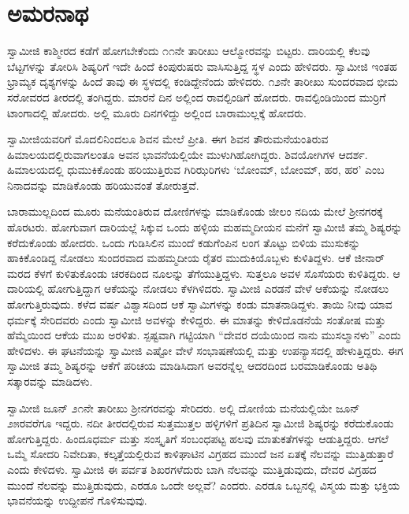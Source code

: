
\chapter{ಅಮರನಾಥ  }

 ಸ್ವಾಮೀಜಿ ಕಾಶ್ಮೀರದ ಕಡೆಗೆ ಹೋಗಬೇಕೆಂದು ೧೧ನೇ ತಾರೀಖು ಆಲ್ಮೋರವನ್ನು ಬಿಟ್ಟರು. ದಾರಿಯಲ್ಲಿ ಕೆಲವು ಬೆಟ್ಟಗಳನ್ನು ತೋರಿಸಿ ಶಿಷ್ಯರಿಗೆ ಇದೇ ಹಿಂದೆ ಕಿಂಪುರುಷರು ವಾಸಿಸುತ್ತಿದ್ದ ಸ್ಥಳ ಎಂದು ಹೇಳಿದರು. ಸ್ವಾಮೀಜಿ ಇಂತಹ ಭ್ರಾಮ್ಯಕ ದೃಶ್ಯಗಳನ್ನು ಹಿಂದೆ ತಾವು ಈ ಸ್ಥಳದಲ್ಲಿ ಕಂಡಿದ್ದೇನೆಂದು ಹೇಳಿದರು. ೧೨ನೇ ತಾರೀಖು ಸುಂದರವಾದ ಭೀಮ ಸರೋವರದ ತೀರದಲ್ಲಿ ತಂಗಿದ್ದರು. ಮಾರನೆ ದಿನ ಅಲ್ಲಿಂದ ರಾವಲ್ಪಿಂಡಿಗೆ ಹೋದರು. ರಾವಲ್ಪಿಂಡಿಯಿಂದ ಮುರ‍್ರಿಗೆ ಟಾಂಗಾದಲ್ಲಿ ಹೋದರು. ಅಲ್ಲಿ ಮೂರು ದಿನಗಳಿದ್ದು ಅಲ್ಲಿಂದ ಬಾರಾಮುಲ್ಲಕ್ಕೆ ಹೋದರು. 

 ಸ್ವಾಮೀಜಿಯವರಿಗೆ ಮೊದಲಿನಿಂದಲೂ ಶಿವನ ಮೇಲೆ ಪ್ರೀತಿ. ಈಗ ಶಿವನ ತೌರುಮನೆಯಂತಿರುವ ಹಿಮಾಲಯದಲ್ಲಿರುವಾಗಲಂತೂ ಅವನ ಭಾವನೆಯಲ್ಲಿಯೇ ಮುಳುಗಿಹೋಗಿದ್ದರು. ಶಿವಯೋಗಿಗಳ ಆದರ್ಶ. ಹಿಮಾಲಯದಲ್ಲಿ ಧುಮುಕಿಕೊಂಡು ಹರಿಯುತ್ತಿರುವ ಗಿರಿಝರಿಗಳು ‘ಬೋಂಮ್, ಬೋಂಮ್, ಹರ, ಹರ’ ಎಂಬ ನಿನಾದವನ್ನು ಮಾಡಿಕೊಂಡು ಹರಿಯುವಂತೆ ತೋರುತ್ತವೆ. 

 ಬಾರಾಮುಲ್ಲದಿಂದ ಮೂರು ಮನೆಯಂತಿರುವ ದೋಣಿಗಳನ್ನು ಮಾಡಿಕೊಂಡು ಜೀಲಂ ನದಿಯ ಮೇಲೆ ಶ‍್ರೀನಗರಕ್ಕೆ ಹೊರಟರು. ಹೋಗುವಾಗ ದಾರಿಯಲ್ಲೆ ಸಿಕ್ಕುವ ಒಂದು ಹಳ್ಳಿಯ ಮಹಮ್ಮದೀಯನ ಮನೆಗೆ ಸ್ವಾಮೀಜಿ ತಮ್ಮ ಶಿಷ್ಯರನ್ನು ಕರೆದುಕೊಂಡು ಹೋದರು. ಒಂದು ಗುಡಿಸಿಲಿನ ಮುಂದೆ ಕಡುಗೆಂಪಿನ ಲಂಗ ತೊಟ್ಟು ಬಿಳಿಯ ಮುಸುಕನ್ನು ಹಾಕಿಕೊಂಡಿದ್ದ ನೋಡಲು ಸುಂದರವಾದ ಮಹಮ್ಮದೀಯ ರೈತರ ಮುದುಕಿಯೊಬ್ಬಳು ಕುಳಿತಿದ್ದಳು. ಆಕೆ ಜೀನಾರ್ ಮರದ ಕೆಳಗೆ ಕುಳಿತುಕೊಂಡು ಚರಕದಿಂದ ನೂಲನ್ನು ತೆಗೆಯುತ್ತಿದ್ದಳು. ಸುತ್ತಲೂ ಅವಳ ಸೊಸೆಯರು ಕುಳಿತಿದ್ದರು. ಆ ದಾರಿಯಲ್ಲಿ ಹೋಗುತ್ತಿದ್ದಾಗ ಆಕೆಯನ್ನು ನೋಡಲು ಕೆಳಗಿಳಿದರು. ಸ್ವಾಮೀಜಿ ಎರಡನೆ ವೇಳೆ ಆಕೆಯನ್ನು ನೋಡಲು ಹೋಗುತ್ತಿರುವುದು. ಕಳೆದ ವರ್ಷ ವಿಶ್ವಾಸದಿಂದ ಆಕೆ ಸ್ವಾಮಿಗಳನ್ನು ಕಂಡು ಮಾತನಾಡಿದ್ದಳು. ತಾಯಿ ನೀವು ಯಾವ ಧರ್ಮಕ್ಕೆ ಸೇರಿದವರು ಎಂದು ಸ್ವಾಮೀಜಿ ಅವಳನ್ನು ಕೇಳಿದ್ದರು. ಈ ಮಾತನ್ನು ಕೇಳಿದೊಡನೆಯೆ ಸಂತೋಷ ಮತ್ತು ಹೆಮ್ಮೆಯಿಂದ ಆಕೆಯ ಮುಖ ಅರಳಿತು. ಸ್ಪಷ್ಟವಾಗಿ ಗಟ್ಟಿಯಾಗಿ “ದೇವರ ದಯೆಯಿಂದ ನಾನು ಮುಸಲ್ಮಾನಳು” ಎಂದು ಹೇಳಿದಳು. ಈ ಘಟನೆಯನ್ನು ಸ್ವಾಮೀಜಿ ಎಷ್ಟೋ‌ ವೇಳೆ ಸಂಭಾಷಣೆಯಲ್ಲಿ ಮತ್ತು ಉಪನ್ಯಾಸದಲ್ಲಿ ಹೇಳುತ್ತಿದ್ದರು. ಈಗ ಸ್ವಾಮೀಜಿ ತಮ್ಮ ಶಿಷ್ಯರನ್ನು ಆಕೆಗೆ ಪರಿಚಯ ಮಾಡಿಸಿದಾಗ ಅವರನ್ನೆಲ್ಲ ಆದರದಿಂದ ಬರಮಾಡಿಕೊಂಡು ಅತಿಥಿ ಸತ್ಕಾರವನ್ನು ಮಾಡಿದಳು. 

 ಸ್ವಾಮೀಜಿ ಜೂನ್ ೨೧ನೇ ತಾರೀಖು ಶ‍್ರೀನಗರವನ್ನು ಸೇರಿದರು. ಅಲ್ಲಿ ದೋಣಿಯ ಮನೆಯಲ್ಲಿಯೇ ಜೂನ್ ೨೫ರವರೆಗೂ ಇದ್ದರು. ನದೀ ತೀರದಲ್ಲಿರುವ ಸುತ್ತಮುತ್ತಲ ಹಳ್ಳಿಗಳಿಗೆ ಪ್ರತಿದಿನ ಸ್ವಾಮೀಜಿ ಶಿಷ್ಯರನ್ನು ಕರೆದುಕೊಂಡು ಹೋಗುತ್ತಿದ್ದರು. ಹಿಂದೂಧರ್ಮ ಮತ್ತು ಸಂಸ್ಕೃತಿಗೆ ಸಂಬಂಧಪಟ್ಟ ಹಲವು ಮಾತುಕತೆಗಳನ್ನು ಆಡುತ್ತಿದ್ದರು. ಆಗಲೆ ಒಮ್ಮೆ ಸೋದರಿ ನಿವೇದಿತಾ, ಕಲ್ಕತ್ತೆಯಲ್ಲಿರುವ ಕಾಳಿಘಾಟಿನ ವಿಗ್ರಹದ ಮುಂದೆ ಜನ ಏತಕ್ಕೆ ನೆಲವನ್ನು ಮುತ್ತಿಡುತ್ತಾರೆ ಎಂದು ಕೇಳಿದಳು. ಸ್ವಾಮೀಜಿ ಈ ಪರ್ವತ ಶಿಖರಗಳೆದುರು ಬಾಗಿ ನೆಲವನ್ನು ಮುತ್ತಿಡುವುದು, ದೇವರ ವಿಗ್ರಹದ ಮುಂದೆ ನೆಲವನ್ನು ಮುತ್ತಿಡುವುದು, ಎರಡೂ ಒಂದೇ ಅಲ್ಲವೆ? ಎಂದರು. ಎರಡೂ ಒಬ್ಬನಲ್ಲಿ ವಿಸ್ಮಯ ಮತ್ತು ಭಕ್ತಿಯ ಭಾವನೆಯನ್ನು ಉದ್ದೀಪನೆ ಗೊಳಿಸುವುವು. 

